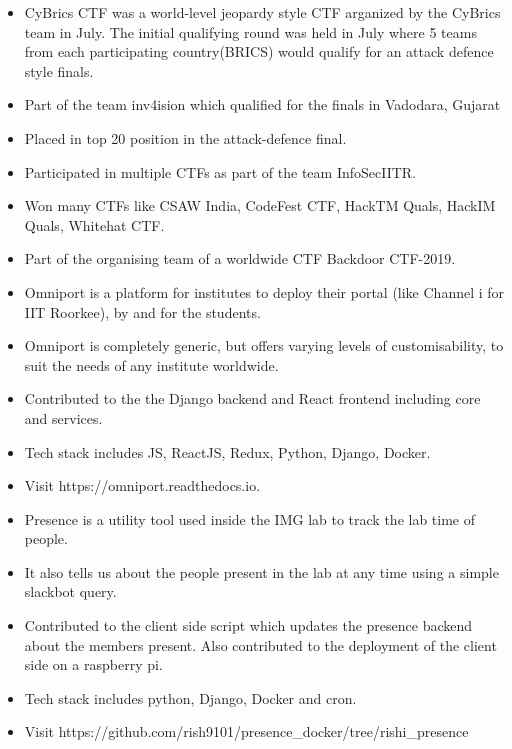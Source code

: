\begin{itemize}
\item CyBrics CTF was a world-level jeopardy style CTF arganized by the CyBrics team in July. The initial qualifying round was held in July where 5 teams from each participating country(BRICS) would qualify for an attack defence style finals.
\item Part of the team inv4ision which qualified for the finals in Vadodara, Gujarat
\item Placed in top 20 position in the attack-defence final.
\end{itemize}
\divider

\begin{itemize}
\item Participated in multiple CTFs as part of the team InfoSecIITR.
\item Won many CTFs like CSAW India, CodeFest CTF, HackTM Quals, HackIM Quals, Whitehat CTF.
\item  Part of the organising team of a worldwide CTF Backdoor CTF-2019.
\end{itemize}
\divider


\begin{itemize}
\item Omniport is a platform for institutes to deploy their portal
(like Channel i for IIT Roorkee), by and for the students.
\item Omniport is completely generic, but offers varying levels of customisability, to suit the needs of any institute worldwide.
\item Contributed to the the Django backend and React frontend including core and services.
\item Tech stack includes JS, ReactJS, Redux, Python, Django, Docker.
\item Visit https://omniport.readthedocs.io.
\end{itemize}
\divider

\begin{itemize}
\item Presence is a utility tool used inside the IMG lab to track the lab time of people.
\item It also tells us about the people present in the lab at any time using a simple slackbot query.
\item Contributed to the client side script which updates the presence backend about the members present. Also contributed to the deployment of the client side on a raspberry pi.
\item Tech stack includes python, Django, Docker and cron.
\item Visit https://github.com/rish9101/presence\_docker/tree/rishi\_presence
\end{itemize}
\divider